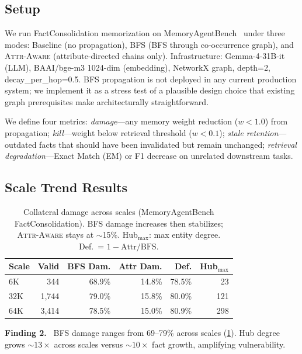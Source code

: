 \documentclass{article}
\newcommand{\attraware}{\textsc{Attr-Aware}}
\newcommand{\bfsprop}{\textsc{BFS}}
\newcommand{\finding}[1]{\vspace{2pt}\noindent\textbf{Finding #1.}~}
\begin{document}
\subsection{Setup}

We run FactConsolidation memorization on MemoryAgentBench~\citep{memoryagentbench_2026} under three modes: Baseline (no propagation), \bfsprop{} (BFS through co-occurrence graph), and \attraware{} (attribute-directed chains only).
Infrastructure: Gemma-4-31B-it (LLM), BAAI/bge-m3 1024-dim (embedding), NetworkX graph, depth=2, decay\_per\_hop=0.5.
BFS propagation is not deployed in any current production system; we implement it as a stress test of a plausible design choice that existing graph prerequisites make architecturally straightforward.

We define four metrics:
\textit{damage}---any memory weight reduction ($w < 1.0$) from propagation;
\textit{kill}---weight below retrieval threshold ($w < 0.1$);
\textit{stale retention}---outdated facts that should have been invalidated but remain unchanged;
\textit{retrieval degradation}---Exact Match (EM) or F1 decrease on unrelated downstream tasks.

\subsection{Scale Trend Results}

\begin{table}[htbp]
\centering
\scriptsize
\begin{tabular}{lrrrrr}
\toprule
\textbf{Scale} & \textbf{Valid} & \textbf{BFS Dam.} & \textbf{Attr Dam.} & \textbf{Def.} & \textbf{Hub$_{\max}$} \\
\midrule
6K   & 344   & 68.9\% & 14.8\% & 78.5\% & 23 \\
32K  & 1,744 & 79.0\% & 15.8\% & 80.0\% & 121 \\
64K  & 3,414 & 78.5\% & 15.0\% & 80.9\% & 298 \\
\bottomrule
\end{tabular}
\caption{Collateral damage across scales (MemoryAgentBench FactConsolidation). BFS damage increases then stabilizes; \attraware{} stays at ${\sim}$15\%. Hub$_{\max}$: max entity degree. Def.\ = $1 - \text{Attr}/\text{BFS}$.}
\label{tab:scale}
\end{table}

\finding{2} BFS damage ranges from 69--79\% across scales (\cref{tab:scale}).
Hub degree grows ${\sim}13\times$ across scales versus ${\sim}10\times$ fact growth, amplifying vulnerability.
\end{document}
